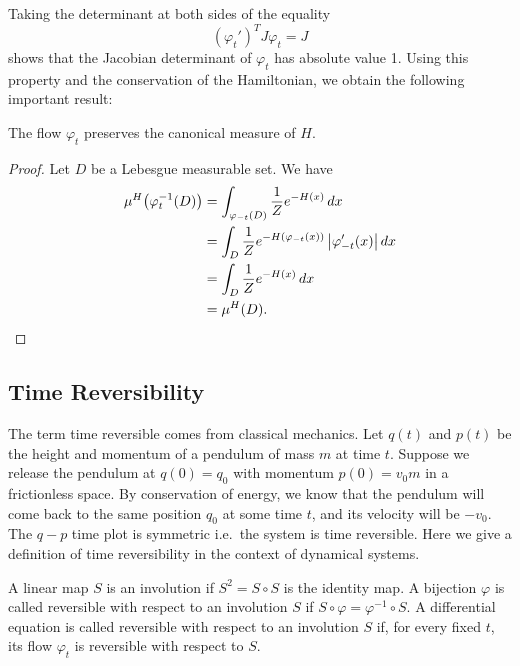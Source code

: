 Taking the determinant at both sides of the equality
\[
\left(\varphi_t'\right)^T J \varphi_t = J
\]
shows that the Jacobian determinant of $\varphi_t$ has absolute value 1. Using this property
and the conservation of the Hamiltonian, we obtain the following important result:

\begin{theorem}
The flow $\varphi_t$ preserves the canonical measure of $H$.
\end{theorem}

\begin{proof}
Let $D$ be a Lebesgue measurable set. We have
\begin{align*}
\mu^H\!\left(\varphi_t^{-1}(D)\right)
&= \int_{\varphi_{-t}(D)} \frac{1}{Z} e^{-H(x)}\,dx \\
&= \int_D \frac{1}{Z} e^{-H(\varphi_{-t}(x))} \left|\varphi_{-t}'(x)\right| dx \\
&= \int_D \frac{1}{Z} e^{-H(x)}\,dx \\
&= \mu^H(D).
\qedhere
\end{align*}
\end{proof}

\subsection{Time Reversibility}
\label{sec:8.1.3}

The term time reversible comes from classical mechanics. Let $q(t)$ and $p(t)$ be the height
and momentum of a pendulum of mass $m$ at time $t$. Suppose we release the pendulum at
$q(0) = q_0$ with momentum $p(0) = v_0 m$ in a frictionless space. By conservation of energy,
we know that the pendulum will come back to the same position $q_0$ at some time $t$, and its
velocity will be $-v_0$. The $q-p$ time plot is symmetric i.e.\ the system is time reversible.
Here we give a definition of time reversibility in the context of dynamical systems.

\begin{definition}
A linear map $S$ is an involution if $S^2 = S \circ S$ is the identity map. A bijection
$\varphi$ is called reversible with respect to an involution $S$ if $S \circ \varphi =
\varphi^{-1} \circ S$. A differential equation is called reversible with respect to an
involution $S$ if, for every fixed $t$, its flow $\varphi_t$ is reversible with respect to $S$.
\end{definition}

